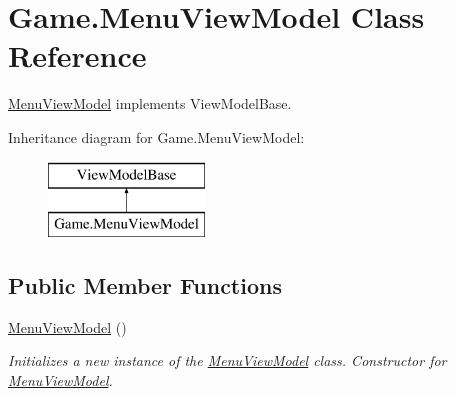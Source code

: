 \hypertarget{class_game_1_1_menu_view_model}{}\section{Game.\+Menu\+View\+Model Class Reference}
\label{class_game_1_1_menu_view_model}


\mbox{\hyperlink{class_game_1_1_menu_view_model}{Menu\+View\+Model}} implements View\+Model\+Base.  


Inheritance diagram for Game.\+Menu\+View\+Model\+:\begin{figure}[H]
\begin{center}
\leavevmode
\includegraphics[height=2.000000cm]{class_game_1_1_menu_view_model}
\end{center}
\end{figure}
\subsection*{Public Member Functions}
\begin{DoxyCompactItemize}
\item 
\mbox{\hyperlink{class_game_1_1_menu_view_model_ac1e0530bc099fda750ee5fcda33bccc1}{Menu\+View\+Model}} ()
\begin{DoxyCompactList}\small\item\em Initializes a new instance of the \mbox{\hyperlink{class_game_1_1_menu_view_model}{Menu\+View\+Model}} class. Constructor for \mbox{\hyperlink{class_game_1_1_menu_view_model}{Menu\+View\+Model}}. \end{DoxyCompactList}\end{DoxyCompactItemize}
